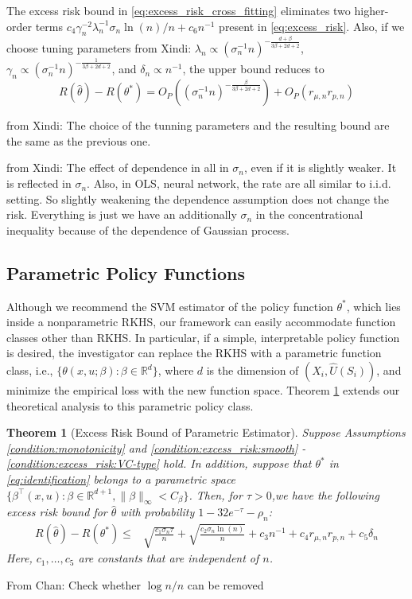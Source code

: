 \documentclass[12pt]{article}
\newtheorem{theorem}{Theorem}%
\newcommand{\R}{\mathbb{R}}
\newcommand{\CP}[1]{{\color{purple}From Chan: #1}}
\newcommand{\XL}[1]{{\color{blue}from Xindi: #1}}
\begin{document}
The excess risk bound in \eqref{eq:excess_risk_cross_fitting} eliminates two higher-order terms $c_4\gamma_n^{-2}\lambda_n^{-1}\sigma_n\ln(n)/n+c_6n^{-1}$ present in \eqref{eq:excess_risk}. Also, if we choose tuning parameters \XL{$\lambda_n \propto (\sigma_n^{-1}n)^{-\frac{d+\beta}{3\beta + 2d + 2}}$, $\gamma_n\propto (\sigma_n^{-1}n)^{-\frac{1}{3\beta + 2d + 2}}$, and $\delta_n\propto n^{-1}$, the upper bound reduces to 
$$R(\widehat\theta)-R\left(\theta^*\right)=O_P\left((\sigma_n^{-1}n)^{-\frac{\beta}{3\beta + 2d + 2}}\right)+O_P(r_{\mu,n}r_{p,n} )$$}

\XL{The choice of the tunning parameters and the resulting bound are the same as the previous one.}

\XL{The effect of dependence in all in $\sigma_n$, even if it is slightly weaker. It is reflected in $\sigma_n$. Also, in OLS, neural network, the rate are all similar to i.i.d. setting. So slightly weakening the dependence assumption does not change the risk. Everything is just we have an additionally $\sigma_n$ in the concentrational inequality because of the dependence of Gaussian process.}
\subsection{Parametric Policy Functions}

Although we recommend the SVM estimator of the policy function $\theta^*$, which lies inside a nonparametric RKHS, our framework can easily accommodate function classes other than RKHS. In particular, if a simple, interpretable policy function is desired, the investigator can replace the RKHS with a parametric function class, i.e., $\{\theta(x,u;\beta):\beta\in \R^{d}\}$, where $d$ is the dimension of $(X_i,\widehat U(S_i))$, and minimize the empirical loss with the new function space. Theorem \ref{thm:excess_risk_parametric} extends our theoretical analysis to this parametric policy class.

\begin{theorem}[Excess Risk Bound of Parametric Estimator] \label{thm:excess_risk_parametric}
     Suppose Assumptions \ref{condition:monotonicity} and \ref{condition:excess_risk:smooth} - \ref{condition:excess_risk:VC-type} hold. In addition, suppose that $\theta^*$ in \eqref{eq:identification} belongs to a parametric space $\{\beta^\top(x,u):\beta\in \R^{d+1},\|\beta\|_\infty<C_\beta\}$. Then, for $\tau>0$,we have the following excess risk bound for $\widehat\theta$ with probability $1-32e^{-\tau}-\rho_n$:
\begin{align}
       R(\widehat\theta)-R\left(\theta^*\right)\leq &  \sqrt{\frac{c_1\sigma_n\tau}{n}} + \sqrt{\frac{ c_2\sigma_n\ln(n)}{n}}  + c_3n^{-1}+ c_4r_{\mu,n}r_{p,n} + c_5{\delta_n}\label{eq:excess_risk_parametric}
    \end{align} 
Here, $c_1,\ldots,c_5$ are constants that are independent of $n$. 
\end{theorem}
\CP{Check whether $\log{n}/n$ can be removed}
\end{document}
